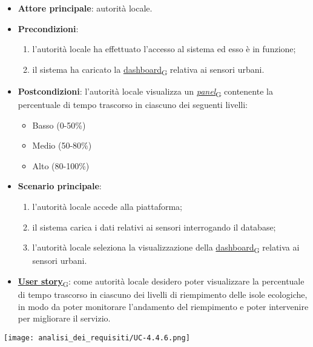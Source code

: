 \begin{itemize}
	\item \textbf{Attore principale}: autorità locale.
	\item \textbf{Precondizioni}:
	      \begin{enumerate}
		      \item l'autorità locale ha effettuato l'accesso al sistema ed esso è in funzione;
		      \item il sistema ha caricato la \href{https://7last.github.io/docs/pb/documentazione-interna/glossario\#dashboard}{dashboard\textsubscript{G}} relativa ai sensori urbani.
	      \end{enumerate}
	\item \textbf{Postcondizioni}: l'autorità locale visualizza un \href{https://7last.github.io/docs/pb/documentazione-interna/glossario\#panel}{\textit{panel}\textsubscript{G}} contenente la percentuale di tempo trascorso in ciascuno dei seguenti livelli:
	      \begin{itemize}
		      \item Basso (0-50\%)
		      \item Medio (50-80\%)
		      \item Alto (80-100\%)
	      \end{itemize}
	\item \textbf{Scenario principale}:
	      \begin{enumerate}
		      \item l'autorità locale accede alla piattaforma;
		      \item il sistema carica i dati relativi ai sensori interrogando il database;
		      \item l'autorità locale seleziona la visualizzazione della \href{https://7last.github.io/docs/pb/documentazione-interna/glossario\#dashboard}{dashboard\textsubscript{G}} relativa ai sensori urbani.
	      \end{enumerate}
	\item \href{https://7last.github.io/docs/pb/documentazione-interna/glossario\#user-story}{\textbf{User story}\textsubscript{G}}:
	      come autorità locale desidero poter visualizzare la percentuale di tempo trascorso in ciascuno dei livelli di riempimento delle isole ecologiche,
	      in modo da poter monitorare l'andamento del riempimento e poter intervenire per migliorare il servizio.
\end{itemize}
\begin{center}
	\texttt{[image: analisi\_dei\_requisiti/UC-4.4.6.png]}
\end{center}

